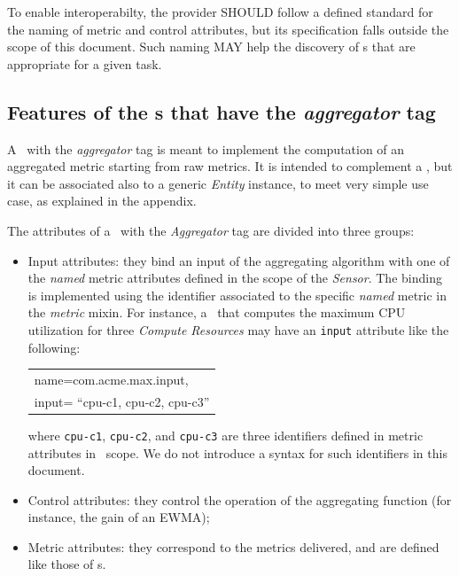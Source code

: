 \documentclass[10pt]{article}  %
\begin{document}
\newcommand{\attrname}[1]{To enable interoperabilty, the provider SHOULD follow a defined standard for the naming of #1 attributes, but its specification falls outside the scope of this document. Such naming MAY help the discovery of \mi s that are appropriate for a given task.}

\attrname{metric and control}

\subsection{Features of the \mi s that have the {\em aggregator} tag \label{sec:Aggregator}}

A \mi\ with the {\em aggregator} tag is meant to implement the computation of an aggregated metric starting from raw metrics. It is intended to complement a \sens, but it can be associated also to a generic {\em Entity} instance, to meet very simple use case, as explained in the appendix.


The attributes of a \mi\ with the {\em Aggregator} tag are divided into three groups:

\begin{itemize}

\item Input attributes: they bind an input of the aggregating algorithm with one of the {\em named} metric attributes defined in the scope of the {\em Sensor}. The binding is implemented using the identifier associated to the specific {\em named} metric in the {\em metric} mixin. For instance, a \sens\ that computes the maximum CPU utilization for three {\em Compute Resources} may have an {\tt input} attribute like the following: 

\begin{tabular}{l}
name=com.acme.max.input, \\
input= ``cpu-c1, cpu-c2, cpu-c3'' 
\end{tabular}

where {\small \tt cpu-c1}, {\small \tt cpu-c2}, and {\small \tt cpu-c3} are three identifiers defined in metric attributes in \sens\ scope. We do not introduce a syntax for such identifiers in this document.

\item Control attributes: they control the operation of the aggregating function (for instance, the gain of an EWMA);

\item Metric attributes: they correspond to the metrics delivered, and are defined like those of \coll s.
\end{itemize}
\end{document}
